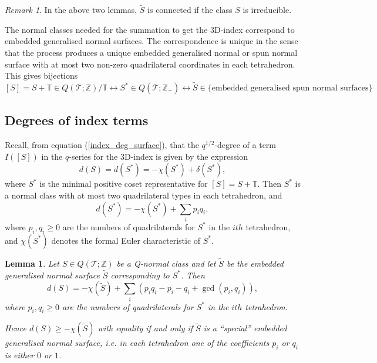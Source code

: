 \documentclass[12pt,reqno]{amsart}  %
\newtheorem{lemma}[thm]{Lemma}
\theoremstyle{definition}
\theoremstyle{remark}
\newtheorem{rmk}[thm]{Remark}
\newcommand{\TT}{\mathbb{T}}
\newcommand{\T}{\mathcal{T}}
\def\Z{\mathbb Z}
\def\TT{\mathbb T}   %
\begin{document}
\begin{rmk}
In the above two lemmas, $\tilde S$ is connected if the class $S$ is 
irreducible.
\end{rmk}

The normal classes needed for the summation to get the 3D-index correspond 
to embedded generalised normal surfaces. The correspondence is unique in 
the sense that the process produces a unique embedded generalised normal 
or spun normal surface with at most two non-zero quadrilateral coordinates 
in each tetrahedron. This gives bijections
$$
[S]=S+\TT \in Q(\T;\Z)/\TT  \leftrightarrow  S^* \in Q(\T;\Z_+) 
\leftrightarrow \tilde S \in 
\{ \text{embedded generalised spun normal surfaces} \}
$$

\subsection{Degrees of index terms}

Recall, from equation (\ref{index_deg_surface}), that the $q^{1/2}$-degree 
of a term $I([S])$  in the $q$-series for the 3D-index is given by the 
expression 
$$
d(S)=d(S^*) =-\chi(S^*) +\delta(S^*),
$$
where $S^*$ is the minimal positive coset representative for $[S]=S+\TT$. 
Then $S^*$ is a normal class with at most two quadrilateral types in each 
tetrahedron, and 
$$
d(S^*)=-\chi(S^*) +\sum_i p_iq_i,
$$
where $p_i,q_i\ge0$ are the numbers of quadrilaterals for $S^*$ in the 
$ith$ tetrahedron, and $\chi(S^*)$ denotes the formal Euler characteristic 
of $S^*$.

\begin{lemma} 
\label{deg_for_gen_norm_surf}
Let $S \in Q(\T;\Z)$ be a Q-normal class 
and let $\tilde S$ be the embedded generalised normal surface 
$\tilde S$ corresponding to $S^*$. Then
$$d(S)= -\chi(\tilde S)+ \sum_i (p_i q_i - p_i - q_i + \gcd(p_i,q_i)),$$
where $p_i,q_i\ge0$ are the numbers of quadrilaterals for $S^*$ in the 
$ith$ tetrahedron.

Hence
$d(S) \ge -\chi(\tilde S)$ with equality if and only if $\tilde S$ is a  
``special'' embedded generalised normal surface, i.e. in each tetrahedron one 
of the coefficients $p_i$ or $q_i$ is either $0$ or $1$. 
\end{lemma}
\end{document}
